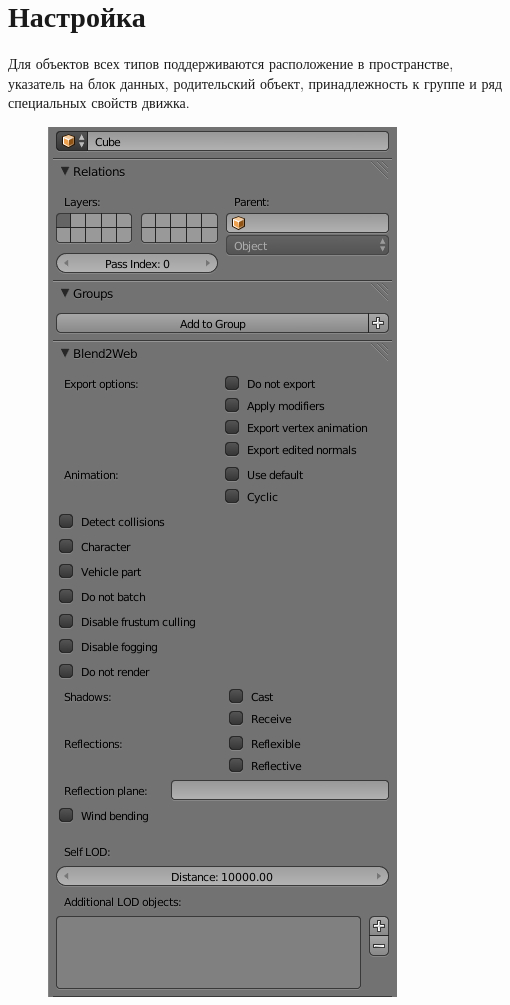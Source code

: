 \documentclass[a4paper,12pt,oneside]{sphinxmanual}
\begin{document}
\section{Настройка}
\label{objects:id3}
Для объектов всех типов поддерживаются расположение в пространстве, указатель на блок данных, родительский объект, принадлежность к группе и ряд специальных свойств движка.
\begin{figure}[htbp]
\centering

\includegraphics[width=0.600\linewidth]{object_setup.jpg}
\end{figure}
\end{document}
